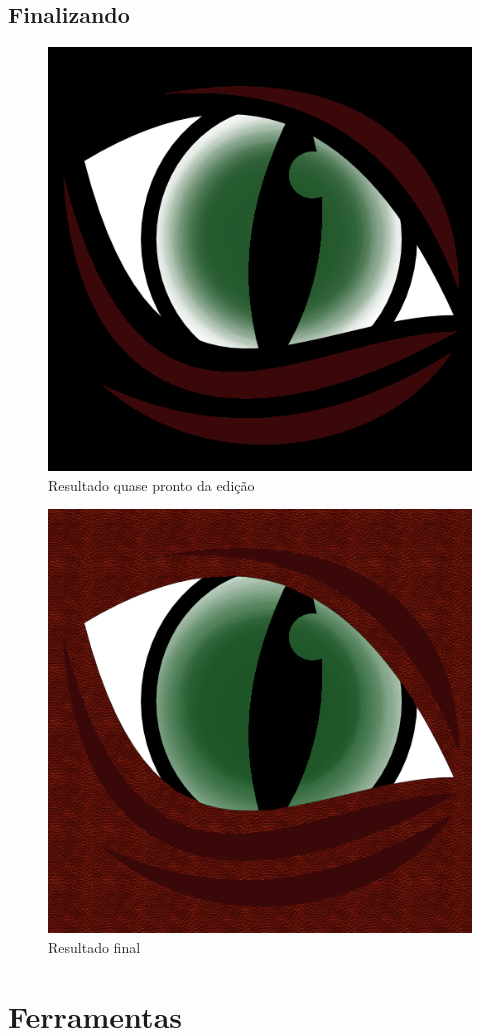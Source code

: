 \documentclass[12pt,onecolumn]{article}
\begin{document}
  \subsection{Finalizando}
    \begin{figure}[H]
      \centering
      \includegraphics[width=.5\textwidth]{screenshots/06-partial.png}
      \caption{Resultado quase pronto da edição}
      \label{fig:partial}
    \end{figure}
    \begin{figure}[H]
      \centering
      \includegraphics[width=.7\linewidth]{draft00.png}
      \caption{Resultado final}
      \label{fig:final}
    \end{figure}
    
\section{Ferramentas}
\end{document}
